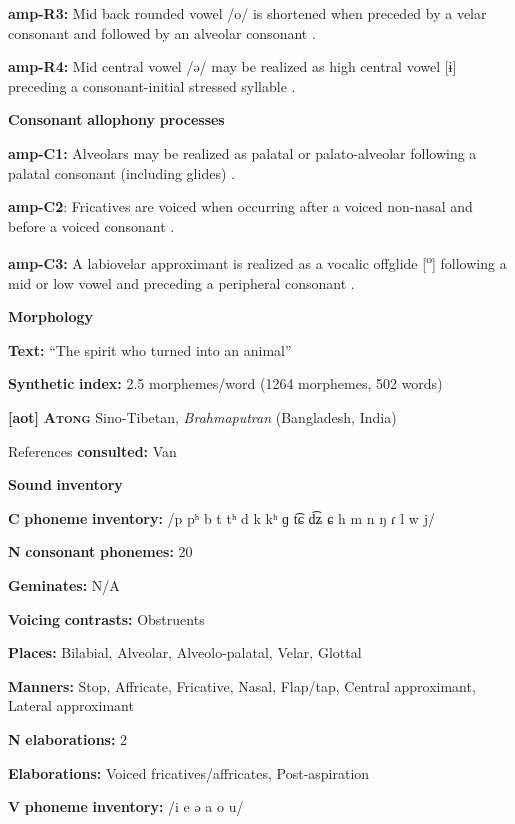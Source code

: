 \textbf{amp-R3:} Mid back rounded vowel /o/ is shortened when preceded by a velar consonant and followed by an alveolar consonant \citep[39]{Bruce1984}.

\textbf{amp-R4:} Mid central vowel /ə/ may be realized as high central vowel [ɨ] preceding a consonant-initial stressed syllable \citep[41]{Bruce1984}.

\textbf{Consonant} \textbf{allophony} \textbf{processes}

\textbf{amp-C1:} Alveolars may be realized as palatal or palato-alveolar following a palatal consonant (including glides) \citep[29]{Bruce1984}.

\textbf{amp-C2}: Fricatives are voiced when occurring after a voiced non-nasal and before a voiced consonant \citep[25]{Bruce1984}.

\textbf{amp-C3:} A labiovelar approximant is realized as a vocalic offglide [\textsuperscript{o}] following a mid or low vowel and preceding a peripheral consonant \citep[28]{Bruce1984}.

\textbf{Morphology}

\textbf{Text:} “The spirit who turned into an animal” \citep[323-331]{Bruce1984}

\textbf{Synthetic} \textbf{index:} 2.5 morphemes/word (1264 morphemes, 502 words)

\textbf{[aot]}   \textbf{\textsc{Atong}  }  Sino-Tibetan, \textit{Brahmaputran} (Bangladesh, India)

References \textbf{consulted:} Van \citet{Breugel2008}

\textbf{Sound} \textbf{inventory}

\textbf{C} \textbf{phoneme} \textbf{inventory:} /p pʰ b t tʰ d k kʰ ɡ t͡ɕ d͡ʑ ɕ h m n ŋ ɾ l w j/

\textbf{N} \textbf{consonant} \textbf{phonemes:} 20

\textbf{Geminates:} N/A

\textbf{Voicing} \textbf{contrasts:} Obstruents

\textbf{Places:} Bilabial, Alveolar, Alveolo-palatal, Velar, Glottal

\textbf{Manners:} Stop, Affricate, Fricative, Nasal, Flap/tap, Central approximant, Lateral approximant

\textbf{N} \textbf{elaborations:} 2

\textbf{Elaborations:} Voiced fricatives/affricates, Post-aspiration

\textbf{V} \textbf{phoneme} \textbf{inventory:} /i e ə a o u/

